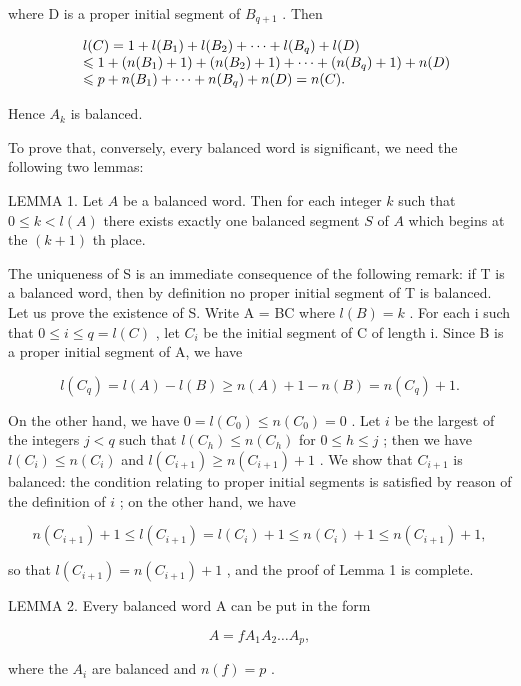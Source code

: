 where D is a proper initial segment of \(B_{q+1}\) . Then

\[
\begin{array}{r l} & l (C) = 1 + l (B _ {1}) + l (B _ {2}) + \dots + l (B _ {q}) + l (D) \\ & \leqslant 1 + (n (B _ {1}) + 1) + (n (B _ {2}) + 1) + \dots + (n (B _ {q}) + 1) + n (D) \\ & \leqslant p + n (B _ {1}) + \dots + n (B _ {q}) + n (D) = n (C). \end{array}
\]

Hence \(A_{k}\) is balanced.

To prove that, conversely, every balanced word is significant, we need the following two lemmas:

LEMMA 1. Let \(A\) be a balanced word. Then for each integer \(k\) such that \(0 \leqslant k < l(A)\) there exists exactly one balanced segment \(S\) of \(A\) which begins at the \((k + 1)\) th place.

The uniqueness of S is an immediate consequence of the following remark: if T is a balanced word, then by definition no proper initial segment of T is balanced. Let us prove the existence of S. Write A = BC where \(l(B) = k\) . For each i such that \(0 \leqslant i \leqslant q = l(C)\) , let \(C_i\) be the initial segment of C of length i. Since B is a proper initial segment of A, we have

\[
l (C _ {q}) = l (A) - l (B) \geqslant n (A) + 1 - n (B) = n (C _ {q}) + 1.
\]

On the other hand, we have \(0 = l(C_0) \leqslant n(C_0) = 0\) . Let \(i\) be the largest of the integers \(j < q\) such that \(l(C_h) \leqslant n(C_h)\) for \(0 \leqslant h \leqslant j\) ; then we have \(l(C_i) \leqslant n(C_i)\) and \(l(C_{i+1}) \geqslant n(C_{i+1}) + 1\) . We show that \(C_{i+1}\) is balanced: the condition relating to proper initial segments is satisfied by reason of the definition of \(i\) ; on the other hand, we have

\[
n (C _ {i + 1}) + 1 \leqslant l (C _ {i + 1}) = l (C _ {i}) + 1 \leqslant n (C _ {i}) + 1 \leqslant n (C _ {i + 1}) + 1,
\]

so that \(l(C_{i+1}) = n(C_{i+1}) + 1\) , and the proof of Lemma 1 is complete.

LEMMA 2. Every balanced word A can be put in the form

\[
A = f A _ {1} A _ {2} \dots A _ {p},
\]

where the \(A_{i}\) are balanced and \(n(f) = p\) .

